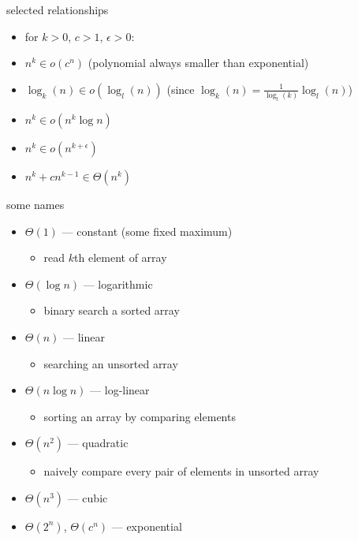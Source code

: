 

\begin{frame}{selected relationships}
\begin{itemize}
\item for $k>0$, $c>1$, $\epsilon>0$:
\item $n^k \in o(c^n)$ (polynomial always smaller than exponential)
\item $\log_k(n) \in o(\log_l(n))$ (since $\log_k(n) = \frac{1}{\log_l(k)}\log_l(n)$)
\item $n^k \in o(n^k \log n)$
\item $n^k \in o(n^{k+\epsilon})$
\item $n^k+cn^{k-1} \in \Theta(n^k)$
\end{itemize}
\end{frame}

\begin{frame}{some names}
\begin{itemize}
\item $\Theta(1)$ --- constant (some fixed maximum)
    \begin{itemize}
    \item read $k$th element of array
    \end{itemize}
\item $\Theta(\log n)$ --- logarithmic
    \begin{itemize}
    \item binary search a sorted array
    \end{itemize}
\item $\Theta(n)$ --- linear
    \begin{itemize}
    \item searching an unsorted array
    \end{itemize}
\item $\Theta(n\log n)$ --- log-linear
    \begin{itemize}
    \item sorting an array by comparing elements
    \end{itemize}
\item $\Theta(n^2)$ --- quadratic
    \begin{itemize}
    \item naively compare every pair of elements in unsorted array
    \end{itemize}
\item $\Theta(n^3)$ --- cubic
\item $\Theta(2^n)$, $\Theta(c^n)$ --- exponential
\end{itemize}
\end{frame}
